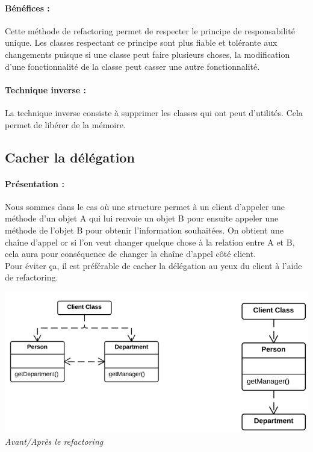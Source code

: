 \documentclass[a4paper,twoside,12pt,openright]{report}
\begin{document}
\paragraph{Bénéfices :}
Cette méthode de refactoring permet de respecter le principe de responsabilité unique.
Les classes respectant ce principe sont plus fiable et tolérante aux changements puisque si une classe peut faire plusieurs choses, la modification d'une fonctionnalité de la classe peut casser une autre fonctionnalité.

\paragraph{Technique inverse :}
La technique inverse consiste à supprimer les classes qui ont peut d'utilités. Cela permet de libérer de la mémoire.\\

\subsection{Cacher la délégation}
\paragraph{Présentation :}
Nous sommes dans le cas où une structure permet à un client d'appeler une méthode d'un objet A qui lui renvoie un objet B pour ensuite appeler une méthode de l'objet B pour obtenir l'information souhaitées. On obtient une chaîne d'appel or si l'on veut changer quelque chose à la relation entre A et B, cela aura pour conséquence de changer la chaîne d'appel côté client.\\
Pour éviter ça, il est préférable de cacher la délégation au yeux du client à l'aide de refactoring.

\begin{center}
\includegraphics[scale=0.7]{Image/Cacher_Delegation.png}\\
\itshape{Avant/Après le refactoring \cite{ref5}}
\end{center}
\end{document}
